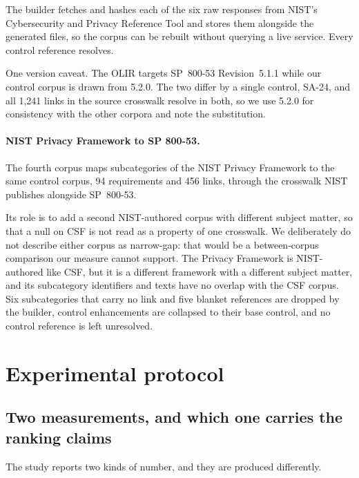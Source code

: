 \documentclass[a4paper,fleqn]{cas-sc}
\begin{document}
The builder fetches and hashes each of the six raw responses from NIST's Cybersecurity and Privacy Reference Tool and stores them alongside the generated files, so the corpus can be rebuilt without querying a live service. Every control reference resolves.

One version caveat. The OLIR targets SP~800-53 Revision~5.1.1 while our control corpus is drawn from 5.2.0. The two differ by a single control, SA-24, and all 1{,}241 links in the source crosswalk resolve in both, so we use 5.2.0 for consistency with the other corpora and note the substitution.

\paragraph{NIST Privacy Framework to SP 800-53.}
\label{sec:dataset-pf}

The fourth corpus maps subcategories of the NIST Privacy Framework to the same control corpus, 94 requirements and 456 links, through the crosswalk NIST publishes alongside SP~800-53.

Its role is to add a second NIST-authored corpus with different subject matter, so that a null on CSF is not read as a property of one crosswalk. We deliberately do not describe either corpus as narrow-gap: that would be a between-corpus comparison our measure cannot support. The Privacy Framework is NIST-authored like CSF, but it is a different framework with a different subject matter, and its subcategory identifiers and texts have no overlap with the CSF corpus. Six subcategories that carry no link and five blanket references are dropped by the builder, control enhancements are collapsed to their base control, and no control reference is left unresolved.


\section{Experimental protocol}
\label{sec:protocol}

\subsection{Two measurements, and which one carries the ranking claims}
\label{sec:protocol-estimands}

The study reports two kinds of number, and they are produced differently.
\end{document}
